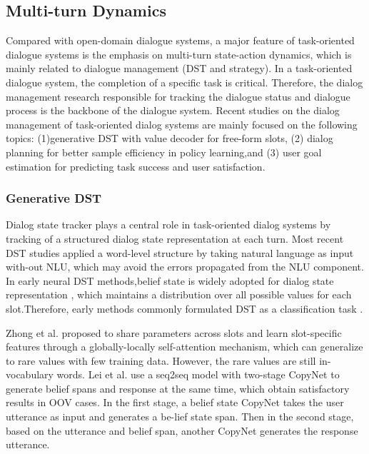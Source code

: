 \documentclass[10pt,twocolumn,letterpaper]{article}
\begin{document}
\subsection{Multi-turn Dynamics}
Compared with open-domain dialogue systems, a major feature of task-oriented dialogue systems is the emphasis on multi-turn state-action dynamics, which is mainly related to dialogue management (DST and strategy). In a task-oriented dialogue system, the completion of a specific task is critical. Therefore, the dialog management research responsible for tracking the dialogue status and dialogue process is the backbone of the dialogue system.
Recent studies on the dialog management of task-oriented dialog systems are mainly focused on the following topics: (1)generative DST with value decoder for free-form slots, (2) dialog planning for better sample efficiency in policy learning,and (3) user goal estimation for predicting task success and user satisfaction.

\subsubsection{Generative DST}
Dialog state tracker plays a central role in task-oriented dialog systems by tracking of a structured dialog state representation at each turn. Most recent DST studies applied a word-level structure by taking natural language as input with-out NLU, which may avoid the errors propagated from the NLU component. In early neural DST methods,belief state is widely adopted for dialog state representation \cite{henderson2014word}, which maintains a distribution over all possible values for each slot.Therefore, early methods commonly formulated DST as a classification task \cite{mrkvsic2016neural,mrkvsic2015multi,henderson2013deep,zhang2019memoryzhang2019neural}.

Zhong et al. \cite{zhang2019neural} proposed to share parameters across slots and learn slot-specific features through a globally-locally self-attention mechanism, which can generalize to rare values with few training data. However, the rare values are still in-vocabulary words. Lei et al.\cite{lei2018sequicity} use a seq2seq model with two-stage CopyNet to generate belief spans and response at the same time, which obtain satisfactory results in OOV cases. In the first stage, a belief state CopyNet\cite{gu2016incorporating} takes the user utterance as input and generates a be-lief state span. Then in the second stage, based on the utterance and belief span, another CopyNet generates the response utterance.
\end{document}
